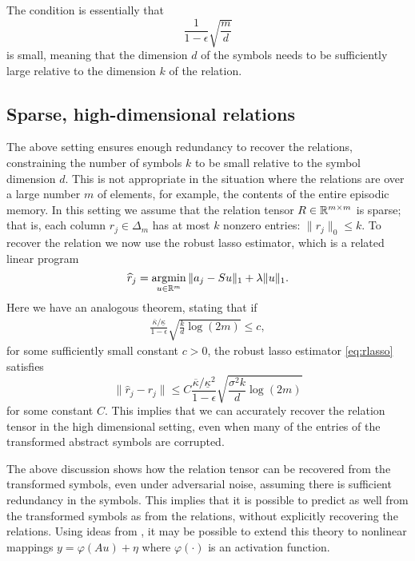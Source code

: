 The condition is essentially that
  \begin{equation}
    \frac{1}{1-\epsilon} \sqrt{\frac{m}{d}}
  \end{equation}
  is small, meaning that the dimension \(d\) of the symbols needs to be sufficiently large relative
  to the dimension \(k\) of the relation.

  \subsection{Sparse, high-dimensional relations}

 The above setting ensures enough redundancy to recover the relations, constraining the number of symbols \(k\) to be small relative to the symbol dimension \(d\). This is not appropriate in the situation where the relations are over a large number \(m\) of elements, for example, the contents of the entire episodic memory.
 In this setting we assume that the relation tensor \(R \in \mathbb{R}^{m\times m}\) is sparse; that is,
 each column \(r_j \in \Delta_m\) has at most \(k\) nonzero entries: \(\|r_j\|_0 \leq k\). To recover the relation
 we now use the robust lasso estimator, which is a related linear program
\begin{equation}
  \widehat r_j = \mathop{\rm argmin}_{u \in\mathbb{R}^m} \| a_j - S u\|_1 + \lambda\|u\|_1. \label{eq:rlasso}
\end{equation}
Here we have an analogous theorem, stating that if
\begin{eqnarray}
  \frac{\overline{\kappa}/\underline{\kappa}}{1-\epsilon}\sqrt{\frac{k}{d}\log(2m)}\leq c,
\end{eqnarray}
for some sufficiently small constant \(c>0\), the robust lasso estimator \eqref{eq:rlasso} satisfies
\begin{equation}
  \|\hat r_j - r_j\| \leq C \frac{\overline{\kappa}/\underline{\kappa}^2}{1-\epsilon} \sqrt{\frac{\sigma^2 k}{d} \log(2m)}
\end{equation}
for some constant \(C\).
This implies that we can accurately recover the relation tensor in the high dimensional setting, even when many of the entries of the transformed abstract symbols are corrupted.


The above discussion shows how the relation tensor can be recovered from the transformed symbols, even under adversarial noise, assuming there is sufficient redundancy in the symbols. This implies that it is possible to predict as well from the transformed symbols as from the relations, without explicitly recovering the relations.
Using ideas from \citep{surfing,HandV17}, it may be possible to extend this theory to nonlinear mappings
\(y = \varphi(Au) + \eta\) where \(\varphi(\cdot)\) is an activation function.




